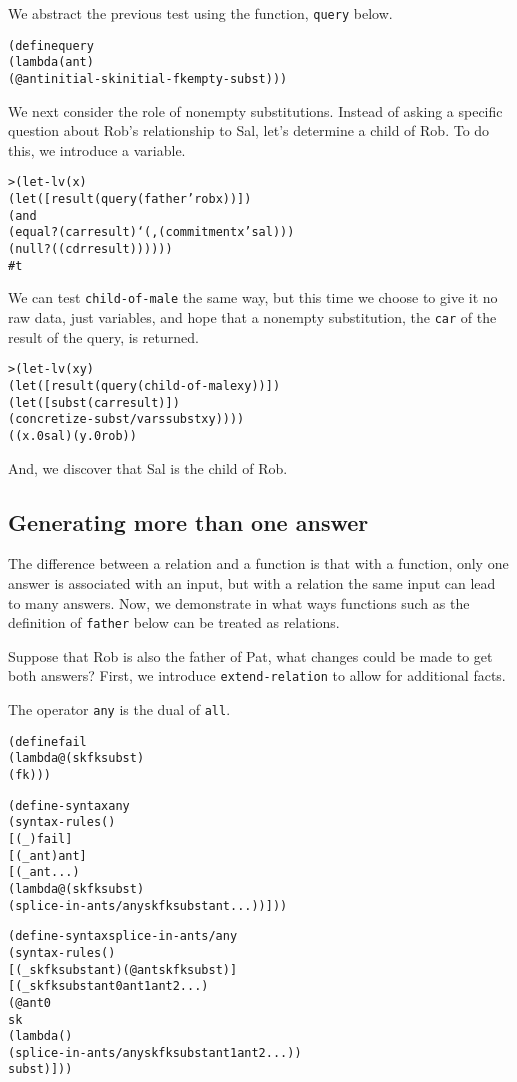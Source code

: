 We abstract the previous test using the function, \texttt{query}
below.

\begin{alltt}
(define query
  (lambda (ant)
    (@ ant initial-sk initial-fk empty-subst)))
\end{alltt}

We next consider the role of nonempty substitutions.  Instead of
asking a specific question about Rob's relationship to Sal, let's
determine a child of Rob.  To do this, we introduce a variable.

\begin{alltt}
> (let-lv (x)
    (let ([result (query (father 'rob x))])
      (and
        (equal? (car result) `(,(commitment x 'sal)))
        (null? ((cdr result))))))
#t
\end{alltt}

We can test \texttt{child-of-male} the same way, but this time we
choose to give it no raw data, just variables, and hope that a
nonempty substitution, the \texttt{car} of the result of the query, is
returned.

\begin{alltt}
> (let-lv (x y)
    (let ([result (query (child-of-male x y))])
      (let ([subst (car result)])
        (concretize-subst/vars subst x y))))
((x.0 sal) (y.0 rob))
\end{alltt}

And, we discover that Sal is the child of Rob.

\subsection{Generating more than one answer}

The difference between a relation and a function is that with a
function, only one answer is associated with an input, but with a
relation the same input can lead to many answers.  Now, we demonstrate
in what ways functions such as the definition of \texttt{father}
below can be treated as relations.

Suppose that Rob is also the father of Pat, what changes could be
made to get both answers?  First, we introduce
\texttt{extend-relation} to allow for additional facts.

The operator \texttt{any} is the dual of \texttt{all}.

\begin{alltt}
(define fail
  (lambda@ (sk fk subst)
    (fk)))

(define-syntax any
  (syntax-rules ()
    [(_) fail]
    [(_ ant) ant]
    [(_ ant ...)
      (lambda@ (sk fk subst)
	(splice-in-ants/any sk fk subst ant ...))]))

(define-syntax splice-in-ants/any
  (syntax-rules ()
    [(_ sk fk subst ant) (@ ant sk fk subst)]
    [(_ sk fk subst ant0 ant1 ant2 ...)
     (@ ant0
        sk
        (lambda ()
          (splice-in-ants/any sk fk subst ant1 ant2 ...))
       subst)]))
\end{alltt}

